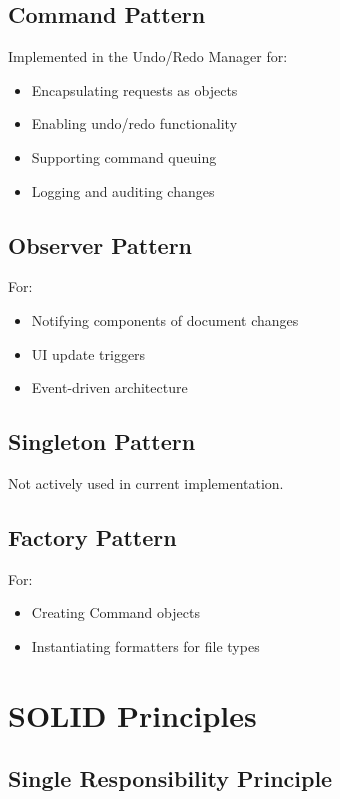 \documentclass[12pt,a4paper,oneside,openany]{report}
\begin{document}
\subsection{Command Pattern}

Implemented in the Undo/Redo Manager for:

\begin{itemize}
	\item Encapsulating requests as objects
	\item Enabling undo/redo functionality
	\item Supporting command queuing
	\item Logging and auditing changes
\end{itemize}

\subsection{Observer Pattern}

For:

\begin{itemize}
	\item Notifying components of document changes
	\item UI update triggers
	\item Event-driven architecture
\end{itemize}

\subsection{Singleton Pattern}

Not actively used in current implementation.

\subsection{Factory Pattern}

For:

\begin{itemize}
	\item Creating Command objects
	\item Instantiating formatters for file types
\end{itemize}

\section{SOLID Principles}

\subsection{Single Responsibility Principle}
\end{document}
